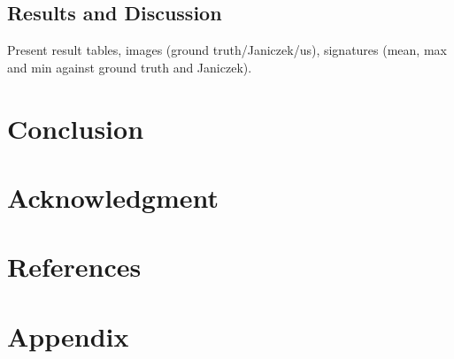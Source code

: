 \documentclass[conference]{IEEEtran}
\begin{document}
\subsection{Results and Discussion}
Present result tables, images (ground truth/Janiczek/us), signatures (mean, max and min against ground truth and Janiczek).


\section{Conclusion}


\section*{Acknowledgment}


\section*{References}




\section{Appendix}
\end{document}
